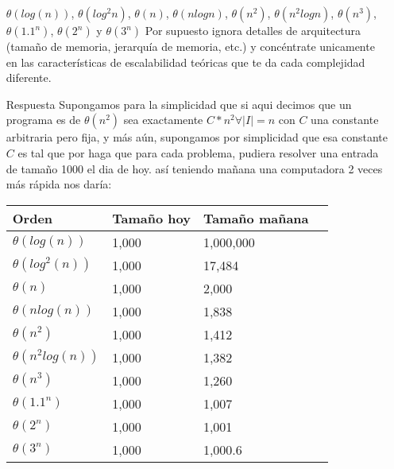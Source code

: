 \documentclass[12pt]{articlels
}
\begin{document}
\begin{itemize}
$\theta(log(n))$, $\theta(log^2 n)$, $\theta(n)$, $\theta(nlogn)$, $\theta(n^2)$, $\theta(n^2logn)$, $\theta(n^3)$, $\theta(1.1^n )$, $\theta(2^n)$ y $\theta(3^n)$ Por supuesto ignora detalles de arquitectura (tamaño de memoria, jerarquía de memoria, etc.) y concéntrate unicamente en las características de escalabilidad teóricas que te da cada complejidad diferente.

\item[Respuesta] Supongamos para la simplicidad que si aqui decimos que un programa es de $\theta(n^2)$ sea exactamente $C*n^2 \forall |I|=n$ con $C$ una constante arbitraria pero fija, y más aún, supongamos por simplicidad que esa constante $C$ es tal que por haga que para cada problema, pudiera resolver una entrada de tamaño 1000 el dia de hoy.
así teniendo mañana una computadora 2 veces más rápida nos daría:

\begin{tabular}{ | l | l | l | l  |}
  \hline
Orden   & Tamaño hoy  &  Tamaño mañana\\
  \hline
$\theta(log(n))$  & 1,000    & 1,000,000\\
$\theta(log^2(n))$ & 1,000   &    17,484\\
$\theta(n)$       & 1,000    &     2,000\\
$\theta(nlog(n))$   & 1,000  &     1,838\\
$\theta(n^2)$     & 1,000    &     1,412\\
$\theta(n^2log(n))$ & 1,000  &     1,382\\
$\theta(n^3)$     & 1,000    &     1,260\\ 
$\theta(1.1^n )$  & 1,000    &     1,007\\
$\theta(2^n)$     & 1,000    &     1,001\\
$\theta(3^n)$     & 1,000    &   1,000.6\\ 
  \hline  
\end{tabular}

\end{itemize}
\end{document}
